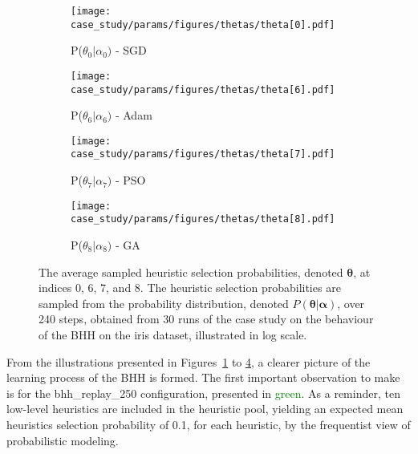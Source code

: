 \begin{figure}[htb]
      \begin{subfigure}{0.5\textwidth}
            \centering
            \texttt{[image: case\_study/params/figures/thetas/theta[0].pdf]}
            \caption{P($\theta_{0} \vert \alpha_{0})$ - \acs{SGD}}
            \label{fig:results:case_study:thetas:0}
      \end{subfigure}
      \begin{subfigure}{0.5\textwidth}
            \centering
            \texttt{[image: case\_study/params/figures/thetas/theta[6].pdf]}
            \caption{P($\theta_{6} \vert \alpha_{6})$ - \acs{Adam}}
            \label{fig:results:case_study:thetas:6}
      \end{subfigure}
      \par\bigskip
      \begin{subfigure}{0.5\textwidth}
            \centering
            \texttt{[image: case\_study/params/figures/thetas/theta[7].pdf]}
            \caption{P($\theta_{7} \vert \alpha_{7})$ - \acs{PSO}}
            \label{fig:results:case_study:thetas:7}
      \end{subfigure}
      \begin{subfigure}{0.5\textwidth}
            \centering
            \texttt{[image: case\_study/params/figures/thetas/theta[8].pdf]}
            \caption{P($\theta_{8} \vert \alpha_{8})$ - \acs{GA}}
            \label{fig:results:case_study:thetas:8}
      \end{subfigure}
      \par\bigskip
      \caption{The average sampled heuristic selection probabilities, denoted $\boldsymbol{\theta}$, at indices 0, 6, 7, and 8. The heuristic selection probabilities are sampled from the probability distribution, denoted $P(\boldsymbol{\theta} \vert \boldsymbol{\alpha})$, over 240 steps, obtained from 30 runs of the case study on the behaviour of the \acs{BHH} on the iris dataset, illustrated in log scale.}
      \label{fig:results:case_study:thetas}
\end{figure}


From the illustrations presented in Figures~\ref{fig:results:case_study:thetas:0} to \ref{fig:results:case_study:thetas:8}, a clearer picture of the learning process of the \acs{BHH} is formed. The first important observation to make is for the bhh\_replay\_250 configuration, presented in \textcolor{green}{green}. As a reminder, ten low-level heuristics are included in the heuristic pool, yielding an expected mean heuristics selection probability of 0.1, for each heuristic, by the frequentist view of probabilistic modeling.


